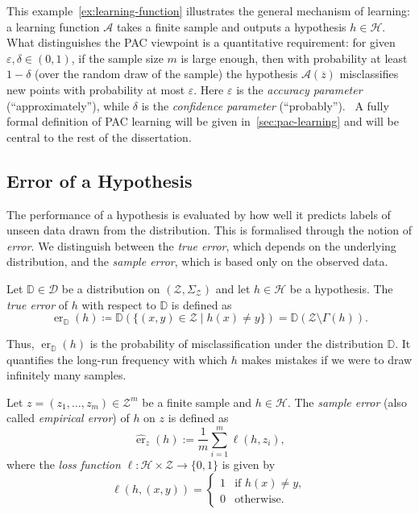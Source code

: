 This example~\ref{ex:learning-function} illustrates the general mechanism of learning: a learning function $\mathcal{A}$ takes a finite sample and outputs a hypothesis $h\in\mathcal{H}$. What distinguishes the PAC viewpoint is a quantitative requirement: for given $\varepsilon,\delta\in(0,1)$, if the sample size $m$ is large enough, then with probability at least $1-\delta$ (over the random draw of the sample) the hypothesis $\mathcal{A}(\overline{z})$ misclassifies new points with probability at most $\varepsilon$. Here
$\varepsilon$ is the \emph{accuracy parameter} (“approximately”),
while $\delta$ is the \emph{confidence parameter} (“probably”).~\cite[Sec 3.1, p.43]{UnderstandinMachineLearning}
A fully formal definition of PAC learning will be given in~\ref{sec:pac-learning} and will be central to the rest of the dissertation.

\subsection{Error of a Hypothesis}

The performance of a hypothesis is evaluated by how well it predicts labels of unseen data drawn from the distribution.
This is formalised through the notion of \emph{error}.
We distinguish between the \emph{true error}, which depends on the underlying distribution, and the \emph{sample error}, which is based only on the observed data.

\begin{definition}
    Let $\mathbb{D} \in \mathcal{D}$ be a distribution on $(\mathcal{Z},\Sigma_{\mathcal{Z}})$
    and let $h \in \mathcal{H}$ be a hypothesis.
    The \emph{true error} of $h$ with respect to $\mathbb{D}$ is defined as
    \[
        \operatorname{er}_{\mathbb{D}}(h) \coloneqq \mathbb{D}(\{(x,y)\in\mathcal{Z} \mid h(x)\neq y\}) = \mathbb{D}(\mathcal{Z}\setminus\Gamma(h)).
    \]
\end{definition}

\noindent
Thus, $\operatorname{er}_{\mathbb{D}}(h)$ is the probability of misclassification under the distribution $\mathbb{D}$.
It quantifies the long-run frequency with which $h$ makes mistakes if we were to draw infinitely many samples.

\begin{definition}
    Let $z = (z_1,\dots,z_m)\in\mathcal{Z}^m$ be a finite sample and $h\in\mathcal{H}$.
    The \emph{sample error} (also called \emph{empirical error}) of $h$ on $z$ is defined as
    \[
        \hat{\operatorname{er}}_{z}(h) := \frac{1}{m}\sum_{i=1}^m \ell(h,z_i),
    \]
    where the \emph{loss function} $\ell:\mathcal{H}\times \mathcal{Z}\to\{0,1\}$ is given by
    \[
        \ell(h,(x,y)) =
        \begin{cases}
            1 & \text{if } h(x)\neq y, \\
            0 & \text{otherwise}.
        \end{cases}
    \]
\end{definition}

